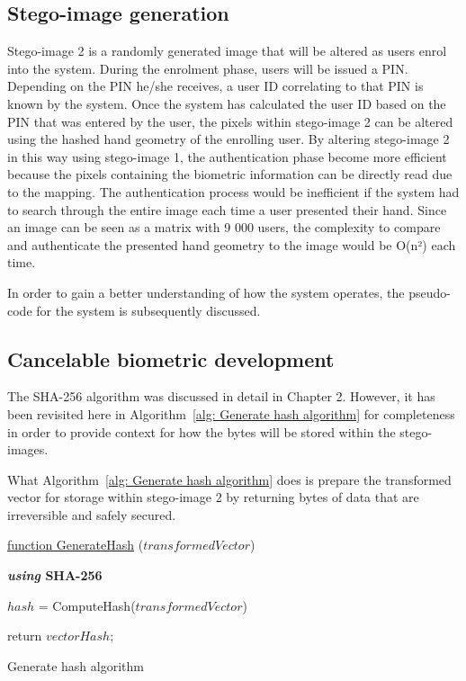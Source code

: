 \subsection{Stego-image generation}

Stego-image 2 is a randomly generated image that will be altered as users enrol into the system. During the enrolment phase, users will be issued a PIN. Depending on the PIN he/she receives, a user ID correlating to that PIN is known by the system. Once the system has calculated the user ID based on the PIN that was entered by the user, the pixels within stego-image 2 can be altered using the hashed hand geometry of the enrolling user. By altering stego-image 2 in this way using stego-image 1, the authentication phase become more efficient because the pixels containing the biometric information can be directly read due to the mapping. The authentication process would be inefficient if the system had to search through the entire image each time a user presented their hand. Since an image can be seen as a matrix with 9 000 users, the complexity to compare and authenticate the presented hand geometry to the image would be O(n²) each time. 

In order to gain a better understanding of how the system operates, the pseudo-code for the system is subsequently discussed.

\subsection{Cancelable biometric development}

The SHA-256 algorithm was discussed in detail in Chapter 2. However, it has been revisited here in Algorithm~\ref{alg: Generate hash algorithm} for completeness in order to provide context for how the bytes will be stored within the stego-images.

What Algorithm~\ref{alg: Generate hash algorithm} does is prepare the transformed vector for storage within stego-image 2 by returning bytes of data that are irreversible and safely secured.

\begin{algorithm}
     
     \underline{function GenerateHash} ($transformedVector$)\;
     
     \textbf{\textit{using} SHA-256}{
        $hash$ = ComputeHash($transformedVector$)\;
        
    
     }
     return $vectorHash$;
     \caption{Generate hash algorithm}
     \label{alg: Generate hash algorithm}
     
\end{algorithm}

